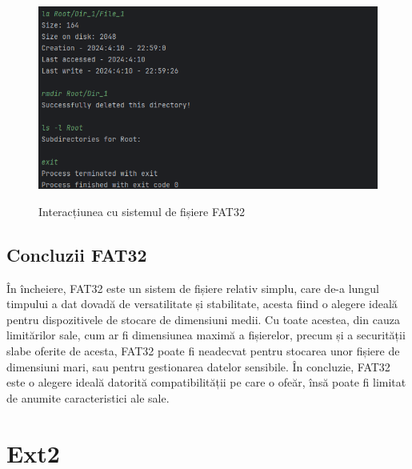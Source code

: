 \clearpage
\begin{figure}[t!]

    \includegraphics[width=1.0\linewidth]{images/2.5.2.png}
    \label{fig:enter-label}
    \caption{Interacțiunea cu sistemul de fișiere FAT32}
\end{figure}

\bigskip


\subsection{Concluzii FAT32}

În încheiere, FAT32 este un sistem de fișiere relativ simplu, care de-a lungul timpului a dat dovadă de versatilitate și stabilitate, acesta fiind o alegere ideală pentru dispozitivele de stocare de dimensiuni medii. Cu toate acestea, din cauza limitărilor sale, cum ar fi dimensiunea maximă a fișierelor, precum și a securității slabe oferite de acesta, FAT32 poate fi neadecvat pentru stocarea unor fișiere de dimensiuni mari, sau pentru gestionarea datelor sensibile. În concluzie, FAT32 este o alegere ideală datorită compatibilității pe care o ofeăr, însă poate fi limitat de anumite caracteristici ale sale.




















\newpage

\section{Ext2}

